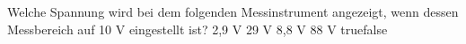     {Welche Spannung wird bei dem folgenden Messinstrument angezeigt, wenn dessen Messbereich auf 10 V eingestellt ist? }
    {2,9 V}
    {29 V}
    {8,8 V}
    {88 V}
    {true}{false}